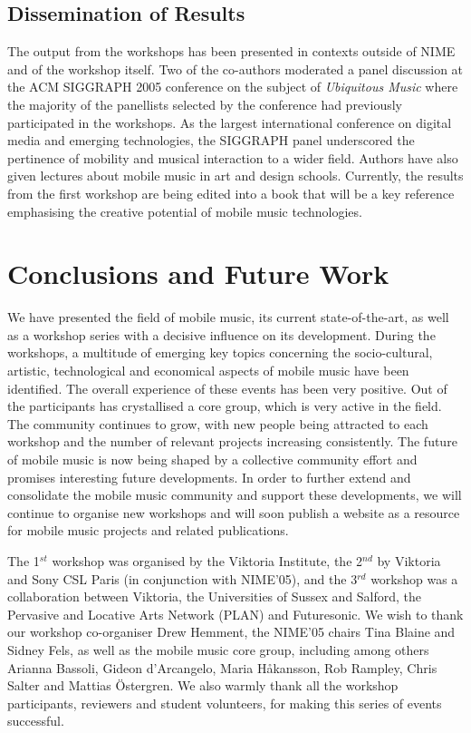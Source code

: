 \subsection{Dissemination of Results}

The output from the workshops has been presented in contexts outside of NIME and
of the workshop itself. Two of the co-authors moderated a panel discussion at the
ACM SIGGRAPH 2005 conference on the subject of \textit{Ubiquitous Music} \cite{Holmquist:2005}
where the majority of the panellists selected by the conference had previously
participated in the workshops. As the largest international conference on digital
media and emerging technologies, the SIGGRAPH panel underscored the pertinence of
mobility and musical interaction to a wider field. Authors have also given
lectures about mobile music in art and design schools. Currently, the results
from the first workshop are being edited into a book that will be a key reference
emphasising the creative potential of mobile music technologies.

\section{Conclusions and Future Work}

We have presented the field of mobile music, its current state-of-the-art, as
well as a workshop series with a decisive influence on its development. During
the workshops, a multitude of emerging key topics concerning the socio-cultural,
artistic, technological and economical aspects of mobile music have been
identified. The overall experience of these events has been very positive. Out of
the participants has crystallised a core group, which is very active in the
field. The community continues to grow, with new people being attracted to each
workshop and the number of relevant projects increasing consistently. The future
of mobile music is now being shaped by a collective community effort and promises
interesting future developments. In order to further extend and consolidate the
mobile music community and support these developments, we will continue to
organise new workshops and will soon publish a website as a resource for mobile
music projects and related publications.

\begin{acknowledgement}
The 1$^{st}$ workshop was organised by the Viktoria Institute, the 2$^{nd}$ by
Viktoria and Sony CSL Paris (in conjunction with NIME'05), and the 3$^{rd}$
workshop was a collaboration between Viktoria, the Universities of Sussex and
Salford, the Pervasive and Locative Arts Network (PLAN) and Futuresonic. We wish
to thank our workshop co-organiser Drew Hemment, the NIME'05 chairs Tina Blaine
and Sidney Fels, as well as the mobile music core group, including among others
Arianna Bassoli, Gideon d'Arcangelo, Maria H\aa{}kansson, Rob Rampley, Chris
Salter and Mattias \"{O}stergren. We also warmly thank all the workshop
participants, reviewers and student volunteers, for making this series of events
successful.
\end{acknowledgement}

